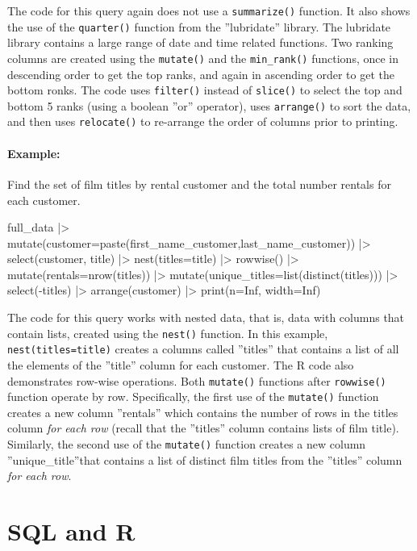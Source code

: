 The code for this query again does not use a \texttt{summarize()} function. It also shows the use of the \texttt{quarter()} function from the ''lubridate'' library. The lubridate library contains a large range of date and time related functions. Two ranking columns are created using the \texttt{mutate()} and the \texttt{min\_rank()} functions, once in descending order to get the top ranks, and again in ascending order to get the bottom ronks. The code uses \texttt{filter()} instead of \texttt{slice()} to select the top and bottom 5 ranks (using a boolean ''or'' operator), uses \texttt{arrange()} to sort the data, and then uses \texttt{relocate()} to re-arrange the order of columns prior to printing.

\paragraph*{Example:} Find the set of film titles by rental customer and the total number rentals for each customer.

\begin{Rcode}
full_data |>
  mutate(customer=paste(first_name_customer,last_name_customer)) |>
  select(customer, title) |>
  nest(titles=title) |>
  rowwise() |> 
  mutate(rentals=nrow(titles)) |>
  mutate(unique_titles=list(distinct(titles))) |>
  select(-titles) |>
  arrange(customer) |>
  print(n=Inf, width=Inf)
\end{Rcode}

The code for this query works with nested data, that is, data with columns that contain lists, created using the \texttt{nest()} function. In this example, \texttt{nest(titles=title)} creates a columns called ''titles'' that contains a list of all the elements of the ''title'' column for each customer. The R code also demonstrates row-wise operations. Both \texttt{mutate()} functions after \texttt{rowwise()} function operate by row. Specifically, the first use of the \texttt{mutate()} function creates a new column ''rentals'' which contains the number of rows in the titles column \emph{for each row} (recall that the ''titles'' column contains lists of film title). Similarly, the second use of the \texttt{mutate()} function creates a new column ''unique\_title''that contains a list of distinct film titles from the ''titles'' column \emph{for each row}.

\section{SQL and R}

